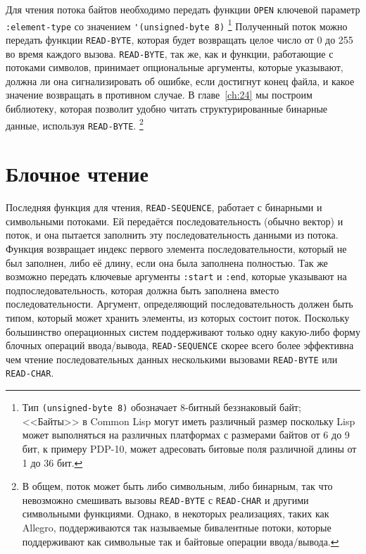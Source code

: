 Для чтения потока байтов необходимо передать функции \lstinline{OPEN} ключевой параметр
\lstinline{:element-type} со значением \lstinline{'(unsigned-byte 8)} \footnote{Тип
  \lstinline{(unsigned-byte 8)} обозначает 8-битный беззнаковый байт; <<Байты>> в Common Lisp
  могут иметь различный размер поскольку Lisp может выполняться на различных платформах с
  размерами байтов от 6 до 9 бит, к примеру PDP-10, может адресовать битовые поля
  различной длины от 1 до 36 бит.} Полученный поток можно передать функции
\lstinline{READ-BYTE}, которая будет возвращать целое число от 0 до 255 во время каждого
вызова. \lstinline{READ-BYTE}, так же, как и функции, работающие с потоками символов, принимает
опциональные аргументы, которые указывают, должна ли она сигнализировать об ошибке, если
достигнут конец файла, и какое значение возвращать в противном случае. В главе~\ref{ch:24}
мы построим библиотеку, которая позволит удобно читать структурированные бинарные данные,
используя \lstinline{READ-BYTE}. \footnote{В общем, поток может быть либо символьным, либо
  бинарным, так что невозможно смешивать вызовы \lstinline{READ-BYTE} с \lstinline{READ-CHAR} и
  другими символьными функциями. Однако, в некоторых реализациях, таких как Allegro,
  поддерживаются так называемые бивалентные потоки, которые поддерживают как символьные
так и байтовые операции ввода/вывода.}

\section{Блочное чтение}

Последняя функция для чтения, \lstinline{READ-SEQUENCE}, работает с бинарными и символьными
потоками. Ей передаётся последовательность (обычно вектор) и поток, и она пытается
заполнить эту последовательность данными из потока. Функция возвращает индекс первого
элемента последовательности, который не был заполнен, либо её длину, если она была
заполнена полностью. Так же возможно передать ключевые аргументы \lstinline{:start} и
\lstinline{:end}, которые указывают на подпоследовательность, которая должна быть заполнена
вместо последовательности. Аргумент, определяющий последовательность должен быть типом,
который может хранить элементы, из которых состоит поток. Поскольку большинство
операционных систем поддерживают только одну какую-либо форму блочных операций
ввода/вывода, \lstinline{READ-SEQUENCE} скорее всего более эффективна чем чтение
последовательных данных несколькими вызовами \lstinline{READ-BYTE} или \lstinline{READ-CHAR}.

